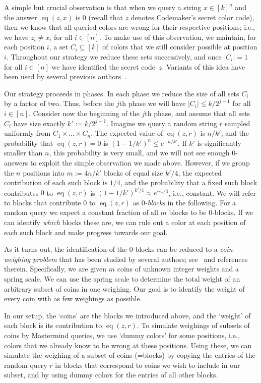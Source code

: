 \documentclass[english,a4paper,11pt]{article}
\DeclareMathOperator{\eq}{eq}
\begin{document}
{A simple but crucial observation is that when we query a string $x \in [k]^n$ and the answer $\eq(z,x)$  is 0 (recall that $z$ denotes Codemaker's secret color code), then we know that all queried colors are wrong for their respective positions; i.e., we have $z_i\neq x_i$ for all $i \in [n]$. To make use of this observation, we maintain, for each position $i$, a set $C_i\subseteq[k]$ of colors that we still consider possible at position $i$. Throughout our strategy we reduce these sets successively, and once $|C_i|=1$ for all $i\in[n]$ we have identified the secret code~$z$. Variants of this idea have been used by several previous authors~\cite{Chvatal83,Goodrich09}.
 
Our strategy proceeds in phases. In each phase we reduce the size of all sets $C_i$ by a factor of two. Thus, before the $j$th phase we will have $|C_i|\leq k/2^{j-1}$ for all $i \in [n]$. 
%
Consider now the beginning of the $j$th phase, and assume that all sets $C_i$ have size exactly $k':=k/2^{j-1}$.  Imagine we query a random string $r$ sampled uniformly from $C_1\times \dots \times C_n$. The expected value of $\eq(z,r)$ is $n/k'$, and the probability that $\eq(z,r)=0$ is $(1-1/k')^n\leq e^{-n/k'}$. If $k'$ is significantly smaller than $n$, this probability is very small, and we will not see enough $0$-answers to exploit the simple observation we made above. However, if we group the $n$ positions into $m:=4n/k'$ blocks of equal size $k'/4$, the expected contribution of each such block is $1/4$, and the probability that a fixed such block contributes $0$ to $\eq(z,r)$ is $(1-1/k')^{k'/4}\approx e^{-1/4}$, i.e., constant. We will refer to blocks that contribute $0$ to $\eq(z,r)$ as \emph{$0$-blocks} in the following. For a random query we expect a constant fraction of all $m$ blocks to be $0$-blocks. If we can identify \emph{which} blocks these are, we can rule out a color at each position of each such block and make progress towards our goal. 

As it turns out, the identification of the $0$-blocks can be reduced to a \emph{coin-weighing problem} that has been studied by several authors; see~\cite{grebinski-journal,Bshouty09} and references therein. Specifically, we are given $m$ coins of unknown integer weights and a spring scale. We can use the spring scale to determine the total weight of an arbitrary subset of coins in one weighing. Our goal is to identify the weight of every coin with as few weighings as possible.

In our setup, the `coins' are the blocks we introduced above, and the `weight' of each block is its contribution to $\eq(z,r)$. To simulate weighings of subsets of coins by Mastermind queries, we use `dummy colors' for some positions, i.e., colors that we already know to be wrong at these positions. Using these, we can simulate the weighing of a subset of coins (=blocks) by copying the entries of the random query $r$ in blocks that correspond to coins we wish to include in our subset, and by using dummy colors for the entries of all other blocks. 

}
\end{document}
